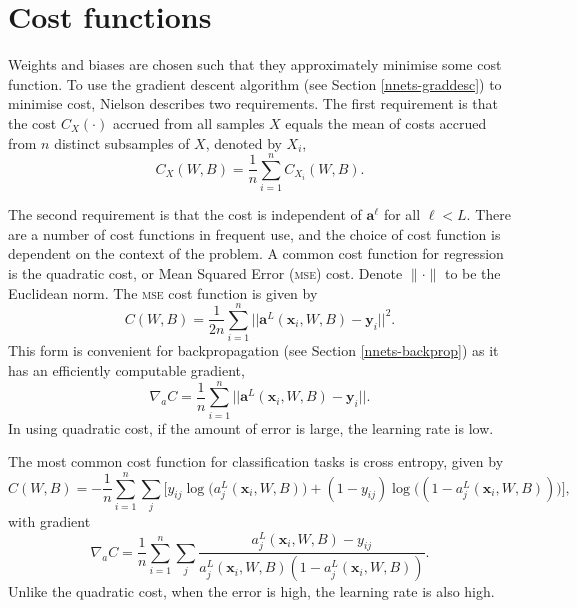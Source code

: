 \section{Cost functions}\label{nnets-cost}

Weights and biases are chosen such that they approximately minimise some cost function. To use the gradient descent algorithm (see Section \ref{nnets-graddesc}) to minimise cost, Nielson \cite{Nielson2015} describes two requirements. The first requirement is that the cost $C_X(\cdot)$ accrued from all samples $X$ equals the mean of costs accrued from $n$ distinct subsamples of $X$, denoted by $X_i$,
\[
	C_X(W, B) = \dfrac{1}{n}\sum_{i=1}^n C_{X_i}(W,B).
\]

The second requirement is that the cost is independent of $\mathbf{a}^\ell$ for all $\ell < L$. There are a number of cost functions in frequent use, and the choice of cost function is dependent on the context of the problem. A common cost function for regression is the quadratic cost, or Mean Squared Error (\textsc{mse}) cost. Denote $\|\cdot\|$ to be the Euclidean norm. The \textsc{mse} cost function is given by
\[
	C(W,B) = \dfrac{1}{2n}\sum_{i=1}^n||\mathbf{a}^L(\mathbf{x}_i,W,B) - \mathbf{y}_i ||^2.
\]
This form is convenient for backpropagation (see Section \ref{nnets-backprop}) as it has an efficiently computable gradient,
\[
	\nabla_aC = \dfrac{1}{n}\sum_{i=1}^n||\mathbf{a}^L(\mathbf{x}_i,W,B) - \mathbf{y}_i ||.
\]
In using quadratic cost, if the amount of error is large, the learning rate is low.

The most common cost function for classification tasks is cross entropy, given by
\[
	C(W,B) = -\dfrac{1}{n}\sum_{i=1}^n\sum_j\big[y_{ij}\log\big(a_j^L(\mathbf{x}_i,W,B)\big) + (1 - y_{ij})\log\big( (1 - a_j^L(\mathbf{x}_i,W,B))\big)\big],
\]
with gradient
\[
	\nabla_aC = \dfrac{1}{n}\sum_{i=1}^n\sum_j\dfrac{a_j^L(\mathbf{x}_i,W,B) - y_{ij}}{a_j^L(\mathbf{x}_i,W,B)(1-a_j^L(\mathbf{x}_i,W,B))}.
\]
Unlike the quadratic cost, when the error is high, the learning rate is also high.


